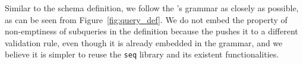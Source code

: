 Similar to the schema definition, we follow the \spec{}'s grammar as closely as possible, as can be seen from Figure~\ref{fig:query_def}. We do not embed the property of non-emptiness of subqueries in the definition because the \spec{} pushes it to a different validation rule, even though it is already embedded in the grammar, and we believe it is simpler to reuse the \texttt{seq} library and its existent functionalities. 

